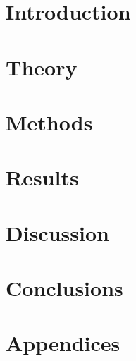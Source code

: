 \documentclass[a4paper, 12pt, openany]{book} %
\begin{document}

\chapter{Introduction}

\cleardoublepage


\chapter{Theory}

\cleardoublepage


\chapter{Methods}

\cleardoublepage

%   


\chapter{Results}

\cleardoublepage


\chapter{Discussion}

\cleardoublepage


\chapter{Conclusions}

\cleardoublepage


\printbibliography[title={References}] %
\cleardoublepage


\chapter*{\LARGE \textbf{Appendices}}
\fancyhf{} %
\renewcommand{\headrulewidth}{0pt} %
\fancyfoot[C]{\thepage} %

\appendix

\end{document}
